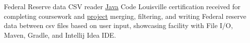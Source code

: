 {Federal Reserve data CSV reader}
{\href{https://github.com/JacobArchambault?tab=repositories\&q=\&type=\&language=java}{Java}}
{Code Louisville certification received for completing coursework and \href{https://github.com/jacobarchambault/codeloujava}{project} merging, filtering, and writing Federal reserve data between csv files based on user input, showcasing facility with 
	File I/O, Maven, Gradle, and Intellij Idea IDE.}
